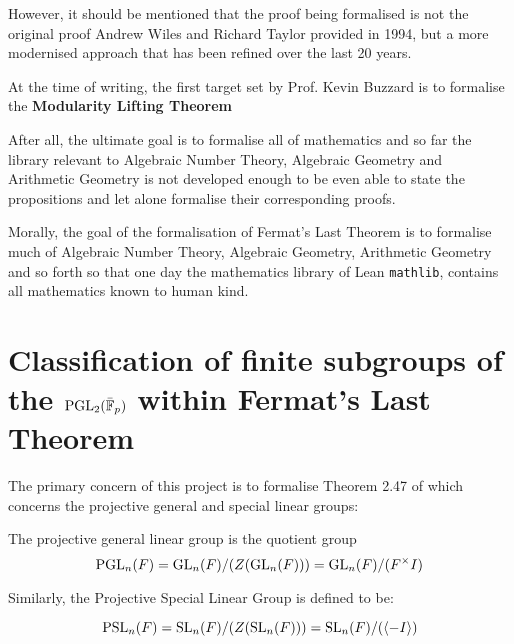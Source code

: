 However, it should be mentioned that the proof being formalised is not the original proof Andrew Wiles and Richard Taylor provided in 1994, 
but a more modernised approach that has been refined over the last 20 years.

At the time of writing, the first target set by Prof. Kevin Buzzard is to formalise the \textbf{Modularity Lifting Theorem}



After all, the ultimate goal is to formalise all of mathematics and so far the library relevant to Algebraic Number Theory, Algebraic Geometry and Arithmetic Geometry is not developed enough
to be even able to state the propositions and let alone formalise their corresponding proofs.

Morally, the goal of the formalisation of Fermat's Last Theorem is to formalise much of Algebraic Number Theory, Algebraic Geometry, Arithmetic Geometry and so forth so that one day
the mathematics library of Lean \texttt{mathlib}, contains all mathematics known to human kind.



\section{Classification of finite subgroups of the $\operatorname{PGL}_2(\bar{\mathbb{F}}_p)$ within Fermat's Last Theorem}

The primary concern of this project is to formalise Theorem 2.47 of \cite{dtt} which 
concerns the projective general and special linear groups:

\begin{definition}
    The projective general linear group is the quotient group
    \[    
    \operatorname{PGL}_n(F) = \operatorname{GL}_n(F) / (Z(\operatorname{GL}_n(F))) = \operatorname{GL}_n(F) / (F^\times I) 
    \]
\end{definition}

Similarly, the Projective Special Linear Group is defined to be:

\begin{definition}
    \[
    \operatorname{PSL}_n(F) = \operatorname{SL}_n(F) / (Z(\operatorname{SL}_n(F))) = \operatorname{SL}_n(F) / (\langle -I\rangle)
    \]
\end{definition}

